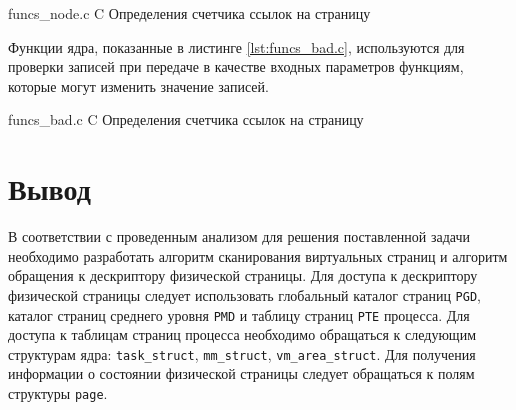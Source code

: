     {funcs_node.c}
    {C}
    {Определения счетчика ссылок на страницу}
    
Функции ядра, показанные в листинге \ref{lst:funcs_bad.c}, используются для проверки записей при передаче в качестве входных параметров функциям, которые могут изменить значение записей.
    
    {funcs_bad.c}
    {C}
    {Определения счетчика ссылок на страницу}

\section*{Вывод}

В соответствии с проведенным анализом для решения поставленной задачи необходимо разработать алгоритм сканирования виртуальных страниц и алгоритм обращения к дескриптору физической страницы. Для доступа к дескриптору физической страницы следует использовать глобальный каталог страниц \texttt{PGD}, каталог страниц среднего уровня \texttt{PMD} и таблицу страниц \texttt{PTE} процесса. Для доступа к таблицам страниц процесса необходимо обращаться к следующим структурам ядра: \texttt{task\_struct}, \texttt{mm\_struct}, \texttt{vm\_area\_struct}. Для получения информации о состоянии физической страницы следует обращаться к полям структуры \texttt{page}.

